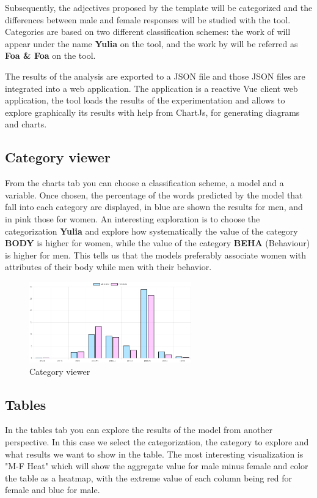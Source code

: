 \documentclass[
twocolumn,
]{ceurart}
\begin{document}
Subsequently, the adjectives proposed by the template will be categorized and the differences between male and female responses will be studied with the tool. Categories are based on two different classification schemes: the work of \citet{tsvetkov-etal-2014-augmenting-english} will appear under the name \textbf{Yulia} on the tool, and the work by \citet{foafoa} will be referred as \textbf{Foa \& Foa} on the tool.

The results of the analysis are exported to a JSON file and those JSON files are integrated into a web application. The application is a reactive Vue client web application, the tool loads the results of the experimentation and allows to explore graphically its results with help from ChartJs, for generating diagrams and charts.

\subsection{Category viewer}
From the charts tab you can choose a classification scheme, a model and a variable. Once chosen, the percentage of the words predicted by the model that fall into each category are displayed, in blue are shown the results for men, and in pink those for women. An interesting exploration is to choose the categorization \textbf{Yulia} and explore how systematically the value of the category \textbf{BODY} is higher for women, while the value of the category \textbf{BEHA} (Behaviour) is higher for men. This tells us that the models preferably associate women with attributes of their body while men with their behavior.

\begin{figure}[htp]
    \centering
    \includegraphics[width=7cm]{pics/f1}
    \caption{Category viewer}
    \label{fig:ctviewer}
\end{figure}

\subsection{Tables}
In the tables tab you can explore the results of the model from another perspective. In this case we select the categorization, the category to explore and what results we want to show in the table. The most interesting visualization is "M-F Heat" which will show the aggregate value for male minus female and color the table as a heatmap, with the extreme value of each column being red for female and blue for male.
\end{document}
